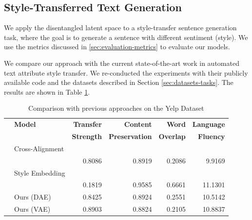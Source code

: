 \subsection{Style-Transferred Text Generation}

We apply the disentangled latent space to a style-transfer sentence generation task, where the goal is to generate a sentence with different sentiment (style). We use the metrics discussed in \ref{sec:evaluation-metrics} to evaluate our models.

We compare our approach with the current state-of-the-art work in automated text attribute style transfer. We re-conducted the experiments with their publicly available code and the datasets described in Section \ref{sec:datasets-tasks}. The results are shown in Table \ref{tab:comparison-previous}.

\begin{table}[ht]
	\centering
	\begin{tabular}{| c | l | r | r | r | r |}
		\hline
		\multirow{2}{*}{} & \textbf{Model}        & \textbf{Transfer} & \textbf{Content}      & \textbf{Word}    & \textbf{Language} \\
		                  &                       & \textbf{Strength} & \textbf{Preservation} & \textbf{Overlap} & \textbf{Fluency}  \\
		\hline
		\hline
		\multirow{2}{*}{} & Cross-Alignment       &                   &                       &                  &                   \\
		                  & \citep{shen2017style} & 0.8086            & 0.8919                & 0.2086           & 9.9169            \\
		\hline
		\multirow{2}{*}{} & Style Embedding       &                   &                       &                  &                   \\
		                  & \citep{fu2017style}   & 0.1819            & 0.9585                & 0.6661           & 11.1301           \\
		\hline
		                  & Ours (DAE)            & 0.8425            & 0.8924                & 0.2551           & 10.5142           \\
		\hline
		                  & Ours (VAE)            & 0.8903            & 0.8824                & 0.2105           & 10.8837           \\
		\hline
	\end{tabular}
	\caption{Comparison with previous approaches on the Yelp Dataset}
	\label{tab:comparison-previous}
\end{table}


